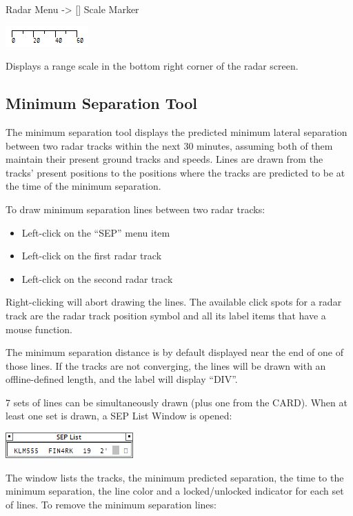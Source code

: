 \documentclass[11pt,a4paper]{memoir}
\begin{document}
Radar Menu -> [] Scale Marker

\includegraphics{img/scale.png}

Displays a range scale in the bottom right corner of the radar screen.

\subsection{Minimum Separation Tool}
\label{mmtool}

The minimum separation tool displays the predicted minimum lateral separation between two radar tracks within the next 30 minutes, assuming both of them maintain their present ground tracks and speeds. Lines are drawn from the tracks’ present positions to the positions where the tracks are predicted to be at the time of the minimum separation.

To draw minimum separation lines between two radar tracks:
\begin{itemize}
    \item Left-click on the “SEP” menu item
    \item Left-click on the first radar track
    \item Left-click on the second radar track
\end{itemize}

Right-clicking will abort drawing the lines. The available click spots for a radar track are the radar track position symbol and all its label items that have a mouse function.

The minimum separation distance is by default displayed near the end of one of those lines. If the tracks are not converging, the lines will be drawn with an offline-defined length, and the label will display “DIV”.

7 sets of lines can be simultaneously drawn (plus one from the CARD). When at least one set is drawn, a SEP List Window is opened:

\includegraphics{img/seplist.png}

The window lists the tracks, the minimum predicted separation, the time to the minimum separation, the line color and a locked/unlocked indicator for each set of lines.
To remove the minimum separation lines:
\end{document}
